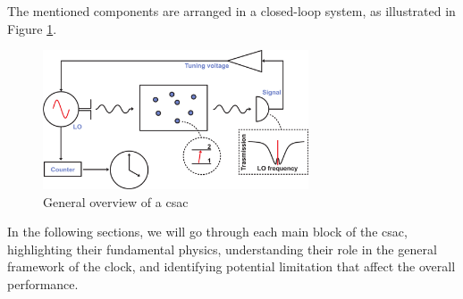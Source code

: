 The mentioned components are arranged in a closed-loop system, as illustrated in Figure \ref{fig:CSAC-general-overview}.

\begin{figure}[H]
    \centering
    \includegraphics[width=0.7\textwidth, max width=\linewidth]{pdf/CSAC-scheme.pdf}
    \caption{General overview of a \acrshort{csac}}
    \label{fig:CSAC-general-overview}
\end{figure}

In the following sections, we will go through each main block of the \acrshort{csac}, highlighting their fundamental physics, understanding their role in the general framework of the clock, and identifying potential limitation that affect the overall performance.
